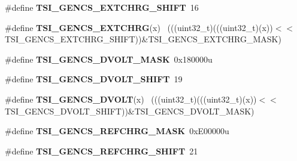 \begin{DoxyCompactItemize}
\item 
\hypertarget{group___t_s_i___register___masks_gaf6315fa37479b4e49a6f3252a451352b}{}\#define {\bfseries T\+S\+I\+\_\+\+G\+E\+N\+C\+S\+\_\+\+E\+X\+T\+C\+H\+R\+G\+\_\+\+S\+H\+I\+F\+T}~16\label{group___t_s_i___register___masks_gaf6315fa37479b4e49a6f3252a451352b}

\item 
\hypertarget{group___t_s_i___register___masks_ga1773fdc3f91b98af2f775331c7f59a7a}{}\#define {\bfseries T\+S\+I\+\_\+\+G\+E\+N\+C\+S\+\_\+\+E\+X\+T\+C\+H\+R\+G}(x)                                      ~(((uint32\+\_\+t)(((uint32\+\_\+t)(x))$<$$<$T\+S\+I\+\_\+\+G\+E\+N\+C\+S\+\_\+\+E\+X\+T\+C\+H\+R\+G\+\_\+\+S\+H\+I\+F\+T))\&T\+S\+I\+\_\+\+G\+E\+N\+C\+S\+\_\+\+E\+X\+T\+C\+H\+R\+G\+\_\+\+M\+A\+S\+K)\label{group___t_s_i___register___masks_ga1773fdc3f91b98af2f775331c7f59a7a}

\item 
\hypertarget{group___t_s_i___register___masks_ga5f993b291aa5098c00c7ca603d76fa8c}{}\#define {\bfseries T\+S\+I\+\_\+\+G\+E\+N\+C\+S\+\_\+\+D\+V\+O\+L\+T\+\_\+\+M\+A\+S\+K}~0x180000u\label{group___t_s_i___register___masks_ga5f993b291aa5098c00c7ca603d76fa8c}

\item 
\hypertarget{group___t_s_i___register___masks_gabef14bd85b2c22b59a963796a510d2aa}{}\#define {\bfseries T\+S\+I\+\_\+\+G\+E\+N\+C\+S\+\_\+\+D\+V\+O\+L\+T\+\_\+\+S\+H\+I\+F\+T}~19\label{group___t_s_i___register___masks_gabef14bd85b2c22b59a963796a510d2aa}

\item 
\hypertarget{group___t_s_i___register___masks_ga82be7f8d184e5f97a4e2f1aca3c9da70}{}\#define {\bfseries T\+S\+I\+\_\+\+G\+E\+N\+C\+S\+\_\+\+D\+V\+O\+L\+T}(x)                                          ~(((uint32\+\_\+t)(((uint32\+\_\+t)(x))$<$$<$T\+S\+I\+\_\+\+G\+E\+N\+C\+S\+\_\+\+D\+V\+O\+L\+T\+\_\+\+S\+H\+I\+F\+T))\&T\+S\+I\+\_\+\+G\+E\+N\+C\+S\+\_\+\+D\+V\+O\+L\+T\+\_\+\+M\+A\+S\+K)\label{group___t_s_i___register___masks_ga82be7f8d184e5f97a4e2f1aca3c9da70}

\item 
\hypertarget{group___t_s_i___register___masks_ga497b1a716e54da9ae1f89fe866c9dfec}{}\#define {\bfseries T\+S\+I\+\_\+\+G\+E\+N\+C\+S\+\_\+\+R\+E\+F\+C\+H\+R\+G\+\_\+\+M\+A\+S\+K}~0x\+E00000u\label{group___t_s_i___register___masks_ga497b1a716e54da9ae1f89fe866c9dfec}

\item 
\hypertarget{group___t_s_i___register___masks_ga53636ad4be1c8098f9475103fdc056e2}{}\#define {\bfseries T\+S\+I\+\_\+\+G\+E\+N\+C\+S\+\_\+\+R\+E\+F\+C\+H\+R\+G\+\_\+\+S\+H\+I\+F\+T}~21\label{group___t_s_i___register___masks_ga53636ad4be1c8098f9475103fdc056e2}


\end{DoxyCompactItemize}
